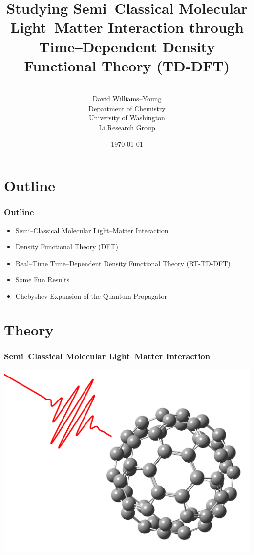 \documentclass{beamer}
\title[]{Studying Semi--Classical Molecular Light--Matter Interaction through
Time--Dependent Density Functional Theory (TD-DFT)}
\author[Li Research Group, University of Washington]{
\\[1\baselineskip]
David Williams--Young \\
Department of Chemistry \\
University of Washington \\
Li Research Group
}
\date{\today}
\begin{document}
\begin{frame}
\titlepage
\end{frame}


\section{Outline}


\begin{frame}
\frametitle{Outline}

\begin{itemize}
  \item Semi--Classical Molecular Light--Matter Interaction 
  \item Density Functional Theory (DFT)
  \item Real--Time Time--Dependent Density Functional Theory (RT-TD-DFT)
  \item Some Fun Results
  \item Chebyshev Expansion of the Quantum Propagator
\end{itemize}
\end{frame}

\section{Theory}

\begin{frame}
\frametitle{Semi--Classical Molecular Light--Matter Interaction}
\includegraphics[width=\textwidth]{BMF_pulse}
\end{frame}
\end{document}
